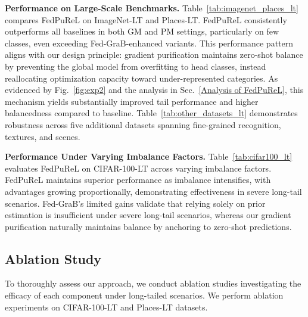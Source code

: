 \documentclass[10pt,twocolumn,letterpaper]{article}
\begin{document}
\noindent \textbf{Performance on Large-Scale Benchmarks.}
Table~\ref{tab:imagenet_places_lt} compares FedPuReL on ImageNet-LT and Places-LT. FedPuReL consistently outperforms all baselines in both GM and PM settings, particularly on few classes, even exceeding Fed-GraB-enhanced variants. This performance pattern aligns with our design principle: gradient purification maintains zero-shot balance by preventing the global model from overfitting to head classes, instead reallocating optimization capacity toward under-represented categories. As evidenced by Fig.~\ref{fig:exp2} and the analysis in Sec.~\ref{Analysis of FedPuReL}, this mechanism yields substantially improved tail performance and higher balancedness compared to baseline. Table~\ref{tab:other_datasets_lt} demonstrates robustness across five additional datasets spanning fine-grained recognition, textures, and scenes.











\noindent \textbf{Performance Under Varying Imbalance Factors.}
Table~\ref{tab:cifar100_lt} evaluates FedPuReL on CIFAR-100-LT across varying imbalance factors. FedPuReL maintains superior performance as imbalance intensifies, with advantages growing proportionally, demonstrating effectiveness in severe long-tail scenarios. Fed-GraB's limited gains validate that relying solely on prior estimation is insufficient under severe long-tail scenarios, whereas our gradient purification naturally maintains balance by anchoring to zero-shot predictions.







\subsection{Ablation Study}
\label{Ablation Studies}

To thoroughly assess our approach, we conduct ablation studies investigating the efficacy of each component under long-tailed scenarios. We perform ablation experiments on CIFAR-100-LT and Places-LT datasets.
\end{document}

